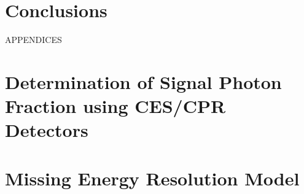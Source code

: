 \documentclass{phd}     %
\theoremstyle{plain}
\theoremstyle{definition}
\numberwithin{equation}{chapter}
\numberwithin{theorem}{chapter}
\numberwithin{definition}{chapter}
\numberwithin{lemma}{chapter}
\numberwithin{corollary}{chapter}
\numberwithin{prop}{chapter}
\numberwithin{remark}{chapter}
\numberwithin{example}{chapter}
\numberwithin{table}{chapter}
\begin{document}
\chapter{Conclusions}\label{chp:Conclusions}



\pagebreak
\mbox{}
\vfill
\begin{center}
APPENDICES
\end{center}
\vfill
\pagebreak

\appendix
\chapter{Determination of Signal Photon Fraction using CES/CPR Detectors}\label{app:CESCPRMtd}


\chapter{Missing Energy Resolution Model}\label{app:MetModel}



\clearpage
\newpage

\end{document}
